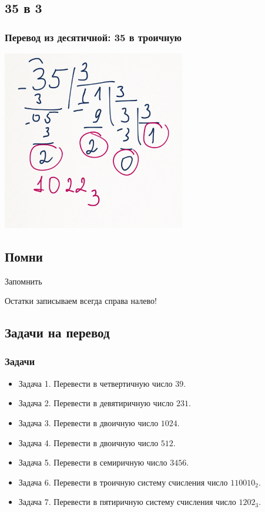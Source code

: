 \documentclass[compress,red]{beamer}
\begin{document}
\subsection{35 в 3}
\begin{frame}[fragile]
  \frametitle{Перевод из десятичной: 35 в троичную}
  \centerline{\includegraphics[width=0.6\textwidth]{images/35_3.png}}
\end{frame}

\subsection{Помни}
\begin{frame}
  \begin{center}
    \Huge{Запомнить}
  \end{center}
  \begin{center}
    \Large{Остатки записываем всегда справа налево!}
  \end{center}
\end{frame}

\subsection{Задачи на перевод}
\begin{frame}[fragile]
  \frametitle{Задачи}
  \begin{itemize}
    \item Задача 1. Перевести в четвертичную число $39$.
    \item Задача 2. Перевести в девятиричную число $231$.
    \item Задача 3. Перевести в двоичную число $1024$.
    \item Задача 4. Перевести в двоичную число $512$.
    \item Задача 5. Перевести в семиричную число $3456$.
    \item Задача 6. Перевести в троичную систему счисления число $110010_2$.
    \item Задача 7. Перевести в пятиричную систему счисления число $1202_3$.
  \end{itemize}
\end{frame}
\end{document}
